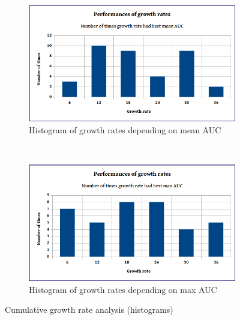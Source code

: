 \begin{figure}
    \centering
    \begin{subfigure}[b]{0.4\textwidth}
        \includegraphics[width=\textwidth]{images/densenet/performances_of_growth_rates_mean_AUC}
        \caption{Histogram of growth rates depending on mean AUC}
        \label{fig:mean_auc_histogram}
    \end{subfigure}
    ~ %
    \begin{subfigure}[b]{0.4\textwidth}
        \includegraphics[width=\textwidth]{images/densenet/performances_of_growth_rates_max_AUC}
        \caption{Histogram of growth rates depending on max AUC}
        \label{fig:max_auc_histogram}
    \end{subfigure}    
    \caption{Cumulative growth rate analysis (histograms)}\label{fig:growthrate_histogram}
\end{figure}

